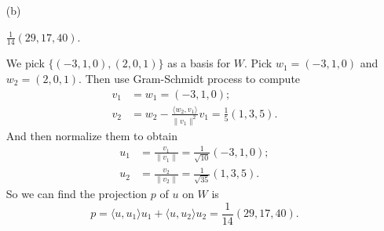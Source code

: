 \begin{Exercise}
\begin{enumerate}[(a)]
\item[(b)]
\begin{answer}
$\frac{1}{14}(29,17,40)$.
\end{answer}
\begin{solution}
We pick $\{(-3,1,0), (2,0,1)\}$ as a basis for $W$. Pick $w_1 = (-3,1,0)$ and $w_2 = (2,0,1)$. Then use Gram-Schmidt process to compute
\begin{align*}
v_1 &= w_1 = (-3,1,0); \\
v_2 &= w_2-\frac{\langle w_2, v_1 \rangle}{\|v_1\|^2} v_1 = \frac{1}{5}(1,3,5).
\end{align*}
And then normalize them to obtain
\begin{align*}
u_1 &= \frac{v_1}{\|v_1\|} = \frac{1}{\sqrt{10}}(-3,1,0); \\
u_2 &= \frac{v_2}{\|v_2\|} = \frac{1}{\sqrt{35}}(1,3,5).
\end{align*}
So we can find the projection $p$ of $u$ on $W$ is
$$
p = \langle u,u_1\rangle u_1 + \langle u,u_2\rangle u_2
= \frac{1}{14}(29,17,40).
$$
\end{solution}
\end{enumerate}
\end{Exercise}